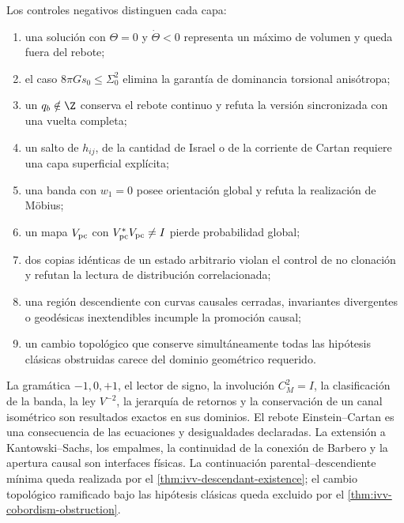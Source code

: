 Los controles negativos distinguen cada capa:
\begin{enumerate}
 \item una soluci\'on con \(\Theta=0\) y \(\dot\Theta<0\) representa un
       m\'aximo de volumen y queda fuera del rebote;
 \item el caso \(8\pi Gs_0\leq\Sigma_0^2\) elimina la garant\'ia de
       dominancia torsional anis\'otropa;
 \item un \(q_b\notin\Z\) conserva el rebote continuo y refuta la versi\'on
       sincronizada con una vuelta completa;
 \item un salto de \(h_{ij}\), de la cantidad de Israel o de la corriente de
       Cartan requiere una capa superficial expl\'icita;
 \item una banda con \(w_1=0\) posee orientaci\'on global y refuta la
       realizaci\'on de M\"obius;
 \item un mapa \(V_{\rm pc}\) con \(V_{\rm pc}^*V_{\rm pc}\ne I\) pierde
       probabilidad global;
 \item dos copias id\'enticas de un estado arbitrario violan el control de no
       clonaci\'on y refutan la lectura de distribuci\'on correlacionada;
 \item una regi\'on descendiente con curvas causales cerradas, invariantes
       divergentes o geod\'esicas inextendibles incumple la promoci\'on causal;
 \item un cambio topol\'ogico que conserve simult\'aneamente todas las
       hip\'otesis cl\'asicas obstruidas carece del dominio geom\'etrico
       requerido.
\end{enumerate}

\begin{proofstatusbox}
La gram\'atica \(-1,0,+1\), el lector de signo, la involuci\'on
\(C_M^2=I\), la clasificaci\'on de la banda, la ley \(V^{-2}\), la jerarqu\'ia
de retornos y la conservaci\'on de un canal isom\'etrico son resultados
exactos en sus dominios. El rebote Einstein--Cartan es una consecuencia de
las ecuaciones y desigualdades declaradas. La extensi\'on a
Kantowski--Sachs, los empalmes, la continuidad de la conexi\'on de Barbero y
la apertura causal son interfaces f\'isicas. La continuaci\'on
parental--descendiente m\'inima queda realizada por el
\cref{thm:ivv-descendant-existence}; el cambio topol\'ogico ramificado bajo
las hip\'otesis cl\'asicas queda excluido por el
\cref{thm:ivv-cobordism-obstruction}.
\end{proofstatusbox}

